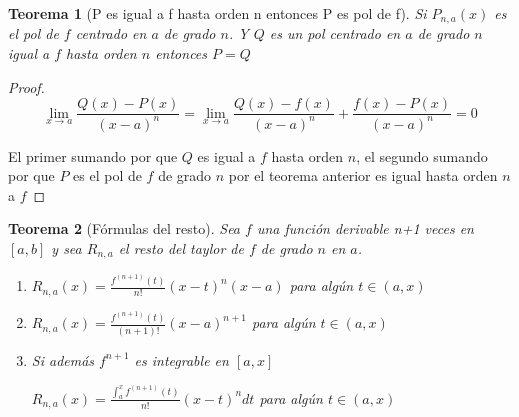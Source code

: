\documentclass{article}
\theoremstyle{break}
\newtheorem{theorem}{Teorema}[section]
\begin{document}
\begin{theorem}[P es igual a f hasta orden n entonces P es pol de f]
	Si $P_{n,a}(x)$ es el pol de $f$ centrado en $a$ de grado $n$. Y $Q$ es un pol centrado
	en $a$ de grado $n$ igual a $f$ hasta orden $n$ entonces $P=Q$  
\end{theorem}
\begin{proof}
	\[ \lim_{x \rightarrow a }\frac{Q(x)-P(x)}{(x-a)^n} = 
	\lim_{x \rightarrow a }\frac{Q(x)-f(x)}{(x-a)^n}+ \frac{f(x)-P(x)}{(x-a)^n} = 0 \]

	El primer sumando por que $Q$ es igual a $f$ hasta orden $n$, el segundo sumando por que
	$P$ es el pol de $f$ de grado $n$ por el teorema anterior es igual hasta orden $n$ a $f$
\end{proof}

\begin{theorem}[Fórmulas del resto]
	Sea $f$ una función derivable n+1 veces en $[a,b]$ y sea $R_{n,a}$ el resto del taylor de $f$
	de grado $n$ en $a$.
	\begin{enumerate}
		\item $R_{n,a}(x) = \frac{f^{(n+1)}(t)}{n!}(x-t)^n(x-a)$ para algún $t\in(a,x)$
		\item $R_{n,a}(x) = \frac{f^{(n+1)}(t)}{(n+1)!}(x-a)^{n+1}$ para algún $t\in(a,x)$
		\item Si además $f^{n+1}$ es integrable en $[a,x]$
		
		$R_{n,a}(x) = \frac{\int_{a}^{x} f^{(n+1)}(t)}{n!}(x-t)^n dt$ para algún $t\in(a,x)$
	\end{enumerate}
\end{theorem}
\end{document}
